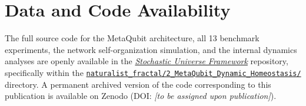 \documentclass[twocolumn,amsmath,amssymb,prl]{revtex4-2}
\begin{document}
\section*{Data and Code Availability}

The full source code for the MetaQubit architecture, all 13 benchmark
experiments, the network self-organization simulation, and the internal
dynamics analyses are openly available in the \href{https://github.com/Organic-Flow/Stochastic-Universe-Framework}{\emph{Stochastic Universe Framework}} repository, specifically within the \href{https://github.com/Organic-Flow/Stochastic-Universe-Framework/tree/master/naturalist_fractal/2_MetaQubit_Dynamic_Homeostasis/}{\texttt{naturalist\_fractal/2\_MetaQubit\_Dynamic\_Homeostasis/}} directory.
A permanent archived version of the code corresponding to this publication
is available on Zenodo (DOI: \emph{[to be assigned upon publication]}).



\end{document}
